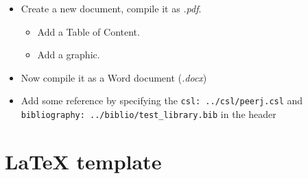 \documentclass[]{article}
\providecommand{\tightlist}{%
  \setlength{\itemsep}{0pt}\setlength{\parskip}{0pt}}
\begin{document}
\begin{itemize}
\item
  Create a new document, compile it as \emph{.pdf}.

  \begin{itemize}
  \tightlist
  \item
    Add a Table of Content.
  \item
    Add a graphic.
  \end{itemize}
\item
  Now compile it as a Word document (\emph{.docx})
\item
  Add some reference by specifying the \texttt{csl:\ ../csl/peerj.csl}
  and \texttt{bibliography:\ ../biblio/test\_library.bib} in the header
\end{itemize}

\hypertarget{latex-template}{%
\section{LaTeX template}\label{latex-template}}
\end{document}
